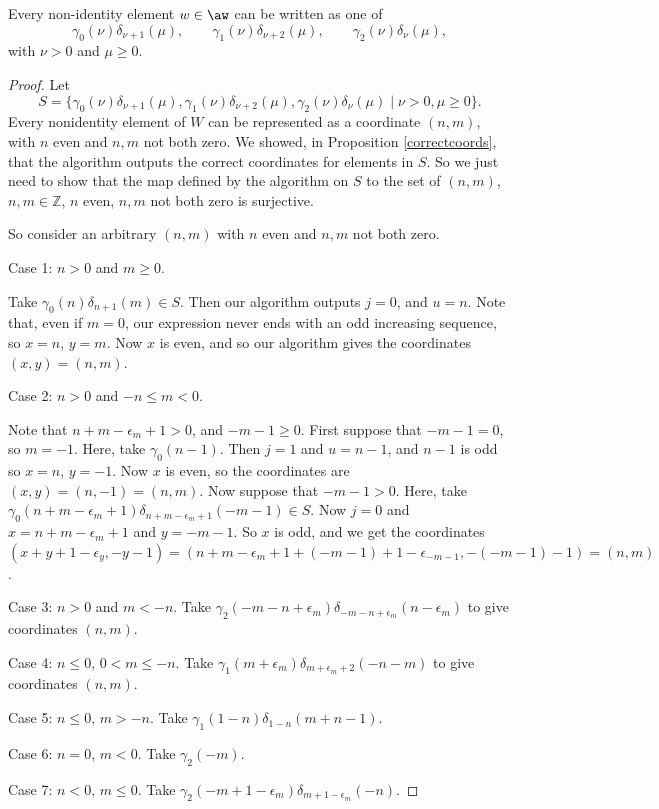 \documentclass[11pt]{article}
\begin{document}
\begin{lemma}\label{cover}
Every non-identity element $w\in \aw$ can be written as one of
\[
\gamma_0(\nu)\delta_{\nu+1}(\mu),\qquad
\gamma_1(\nu)\delta_{\nu+2}(\mu),\qquad
\gamma_2(\nu)\delta_{\nu}(\mu),
\]
with $\nu>0$ and $\mu\geq 0$.
\end{lemma}
\begin{proof}
    Let 
    \[S=\{\gamma_0(\nu)\delta_{\nu+1}(\mu), \gamma_1(\nu)\delta_{\nu+2}(\mu), \gamma_2(\nu)\delta_{\nu}(\mu)\mid \nu>0, \mu\geq 0\}.\]
    Every nonidentity element of $W$ can be represented as a coordinate $(n,m)$, with $n$ even and $n,m$ not both zero. We showed, in Proposition \ref{correctcoords}, that the algorithm outputs the correct coordinates for elements in $S$.  So we just need to show that the map defined by the algorithm on $S$ to the set of $(n,m)$, $n,m\in \mathbb{Z}$, $n$ even, $n,m$ not both zero is surjective. 

    So consider an arbitrary $(n,m)$ with $n$ even and $n,m$ not both zero. 
    
    Case 1: $n>0$ and $m\geq 0$.

    Take $\gamma_0(n)\delta_{n+1}(m)\in S$. Then our algorithm outputs $j=0$, and $u=n$. Note that, even if $m=0$, our expression never ends with an odd increasing sequence, so $x=n$, $y=m$. Now $x$ is even, and so our algorithm gives the coordinates $(x,y)=(n,m)$.

    Case 2: $n>0$ and $-n\leq m<0$. 

    Note that $n+m-\epsilon_m+1>0$, and $-m-1\geq 0$. First suppose that $-m-1=0$, so $m=-1$. Here, take $\gamma_0(n-1)$. Then $j=1$ and $u=n-1$, and $n-1$ is odd so $x=n$, $y=-1$. Now $x$ is even, so the coordinates are $(x,y)=(n,-1)=(n,m)$. Now suppose that $-m-1>0$. Here, take $\gamma_0(n+m-\epsilon_m+1)\delta_{n+m-\epsilon_m+1}(-m-1)\in S$. Now $j=0$ and $x=n+m-\epsilon_m+1$ and $y=-m-1$. So $x$ is odd, and we get the coordinates $(x+y+1-\epsilon_y,-y-1)=(n+m-\epsilon_m+1+(-m-1)+1-\epsilon_{-m-1},-(-m-1)-1)=(n,m)$.


    Case 3: $n>0$ and $m<-n$. Take $\gamma_2(-m-n+\epsilon_m)\delta_{-m-n+\epsilon_m}(n-\epsilon_m)$ to give coordinates $(n,m)$.

    Case 4: $n\leq 0$, $0<m\leq -n$. Take $\gamma_1(m+\epsilon_m)\delta_{m+\epsilon_m+2}(-n-m)$ to give coordinates $(n,m)$. 

    Case 5:  $n\leq 0$, $m> -n$. Take $\gamma_1(1-n)\delta_{1-n}(m+n-1)$.

    Case 6: $n=0$, $m< 0$. Take $\gamma_2(-m)$.

    Case 7: $n< 0$, $m\leq 0$. Take $\gamma_2(-m+1-\epsilon_m)\delta _{m+1-\epsilon_m}(-n)$.   
\end{proof}
\end{document}
